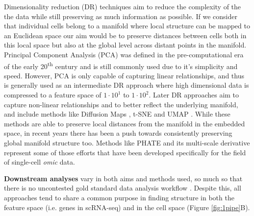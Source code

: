 Dimensionality reduction (DR) techniques aim to reduce the complexity of the the data while still preserving as much information as possible. If we consider that individual cells belong to a manifold where local structure can be mapped to an Euclidean space our aim would be to preserve distances between cells both in this local space but also at the global level across distant points in the manifold. Principal Component Analysis (PCA) \cite{pearson_liii_1901,jolliffe_principal_2016} was defined in the pre-computational era of the early 20\textsuperscript{th} century and is still commonly used due to it's simplicity and speed. However, PCA is only capable of capturing linear relationships, and thus is generally used as an intermediate DR approach where high dimensional data is compressed to a feature space of \(1\cdot10^1\) to \(1\cdot10^2\). Later DR approaches aim to capture non-linear relationships and to better reflect the underlying manifold, and include methods like Diffusion Maps \cite{coifman_diffusion_2006}, t-SNE \cite{van_der_maaten_visualizing_2008} and UMAP \cite{mcinnes_umap_2020}. While these methods are able to preserve local distances from the manifold in the embedded space, in recent years there has been a push towards consistently preserving global manifold structure too. Methods like PHATE \cite{moon_visualizing_2019} and its multi-scale derivative \cite{kuchroo_multiscale_2020} represent some of those efforts that have been developed specifically for the field of single-cell \emph{omic} data.

\textbf{Downstream analyses} vary in both aims and methods used, so much so that there is no uncontested gold standard data analysis workflow \cite{slovin_single-cell_2021}. Despite this, all approaches tend to share a common purpose in finding structure in both the feature space (i.e. genes in scRNA-seq) and in the cell space (Figure \ref{fig:1pipe}B).

